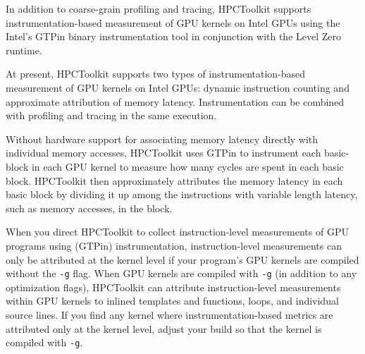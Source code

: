 In addition to coarse-grain profiling and tracing, HPCToolkit supports instrumentation-based measurement of GPU kernels on Intel GPUs using the Intel's GTPin binary instrumentation tool in conjunction with the Level Zero runtime. 



 At present, HPCToolkit supports two types of instrumentation-based measurement of GPU kernels on Intel GPUs: dynamic instruction counting and approximate attribution of memory latency. 
 Instrumentation can be combined with profiling and tracing in the same execution.

 Without hardware support for associating memory latency directly with individual memory accesses, HPCToolkit uses GTPin to instrument each basic-block in each GPU kernel to measure how many cycles are spent in each basic block. HPCToolkit then
 approximately attributes the memory latency in each basic block by dividing it up among the instructions with variable length latency, such as memory accesses, in the block. 

When you direct HPCToolkit to collect instruction-level measurements of GPU programs using (GTPin) instrumentation, instruction-level measurements can only be attributed at the kernel level
if your program's GPU kernels are compiled without the {\tt -g} flag. When GPU kernels are compiled with {\tt -g} (in addition to any optimization flags), HPCToolkit can attribute instruction-level measurements within GPU kernels to inlined templates and functions, loops, and individual source lines. If you find any kernel where instrumentation-based metrics are attributed only at the kernel level, adjust your build so that the kernel is compiled with {\tt -g}.

